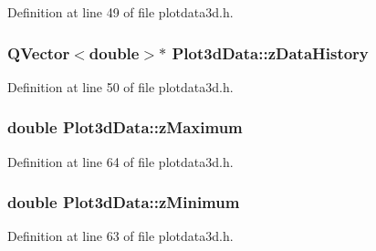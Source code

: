 \-Definition at line 49 of file plotdata3d.\-h.

\hypertarget{group___scope_plugin_gab1e0ead20c4c64f78a8dafc2ae101710}{
\subsubsection[{z\-Data\-History}]{\setlength{\rightskip}{0pt plus 5cm}\-Q\-Vector$<$double$>$$\ast$ {\bf \-Plot3d\-Data\-::z\-Data\-History}}}\label{group___scope_plugin_gab1e0ead20c4c64f78a8dafc2ae101710}


\-Definition at line 50 of file plotdata3d.\-h.

\hypertarget{group___scope_plugin_ga1ad4417e8b0fb7035d1f4c85191812a0}{
\subsubsection[{z\-Maximum}]{\setlength{\rightskip}{0pt plus 5cm}double {\bf \-Plot3d\-Data\-::z\-Maximum}}}\label{group___scope_plugin_ga1ad4417e8b0fb7035d1f4c85191812a0}


\-Definition at line 64 of file plotdata3d.\-h.

\hypertarget{group___scope_plugin_ga0938aa53ec304cabf25b8294dde0a5b0}{
\subsubsection[{z\-Minimum}]{\setlength{\rightskip}{0pt plus 5cm}double {\bf \-Plot3d\-Data\-::z\-Minimum}}}\label{group___scope_plugin_ga0938aa53ec304cabf25b8294dde0a5b0}


\-Definition at line 63 of file plotdata3d.\-h.


